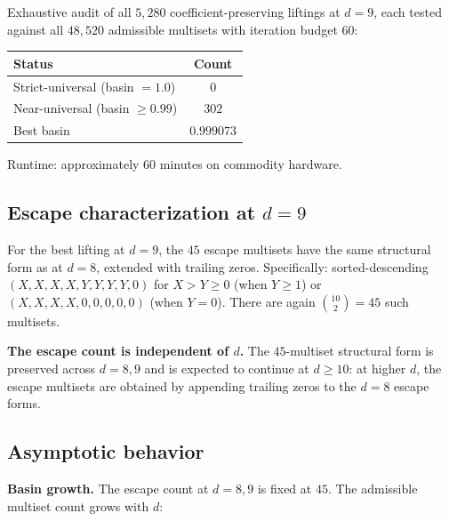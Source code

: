 \documentclass[11pt,letterpaper]{article}
\theoremstyle{paperstyle}
\theoremstyle{paperstyledef}
\theoremstyle{paperstylerem}
\begin{document}
Exhaustive audit of all \(5{,}280\) coefficient-preserving liftings at
\(d = 9\), each tested against all \(48{,}520\) admissible multisets
with iteration budget \(60\):

\begin{longtable}[]{@{}lc@{}}
\toprule\noalign{}
Status & Count \\
\midrule\noalign{}
\endhead
\bottomrule\noalign{}
\endlastfoot
Strict-universal (basin \(= 1.0\)) & \(0\) \\
Near-universal (basin \(\geq 0.99\)) & \(302\) \\
Best basin & \(0.999073\) \\
\end{longtable}

Runtime: approximately \(60\) minutes on commodity hardware.

\hypertarget{e.2.4-escape-characterization-at-d-9}{%
\subsection{\texorpdfstring{Escape characterization at \(d = 9\)}{Escape characterization at d = 9}}\label{e.2.4-escape-characterization-at-d-9}}

For the best lifting at \(d = 9\), the \(45\) escape multisets have the
same structural form as at \(d = 8\), extended with trailing zeros.
Specifically: sorted-descending \((X, X, X, X, Y, Y, Y, Y, 0)\) for
\(X > Y \geq 0\) (when \(Y \geq 1\)) or \((X, X, X, X, 0, 0, 0, 0, 0)\)
(when \(Y = 0\)). There are again \(\binom{10}{2} = 45\) such multisets.

\textbf{The escape count is independent of \(d\).} The \(45\)-multiset
structural form is preserved across \(d = 8, 9\) and is expected to
continue at \(d \geq 10\): at higher \(d\), the escape multisets are
obtained by appending trailing zeros to the \(d = 8\) escape forms.

\hypertarget{e.3-asymptotic-behavior}{%
\subsection{Asymptotic behavior}\label{e.3-asymptotic-behavior}}

\textbf{Basin growth.} The escape count at \(d = 8, 9\) is fixed at
\(45\). The admissible multiset count grows with \(d\):
\end{document}

